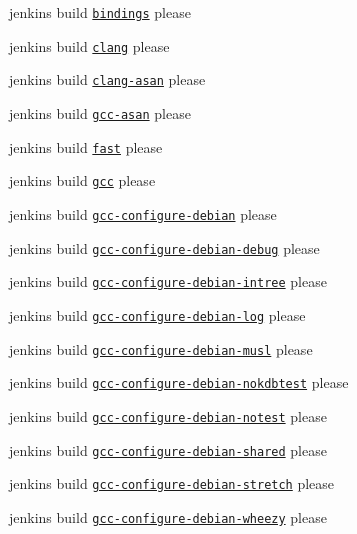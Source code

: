 \begin{DoxyItemize}
\item jenkins build \href{http://build.libelektra.org:8080/job/elektra-test-bindings/}{\tt bindings} please
\item jenkins build \href{http://build.libelektra.org:8080/job/elektra-clang/}{\tt clang} please
\item jenkins build \href{http://build.libelektra.org:8080/job/elektra-clang-asan/}{\tt clang-\/asan} please
\item jenkins build \href{http://build.libelektra.org:8080/job/elektra-gcc-asan/}{\tt gcc-\/asan} please
\item jenkins build \href{http://build.libelektra.org:8080/job/elektra-mergerequests-fast/}{\tt fast} please
\item jenkins build \href{http://build.libelektra.org:8080/job/elektra-gcc/}{\tt gcc} please
\item jenkins build \href{http://build.libelektra.org:8080/job/elektra-gcc-configure-debian/}{\tt gcc-\/configure-\/debian} please
\item jenkins build \href{http://build.libelektra.org:8080/job/elektra-gcc-configure-debian-debug}{\tt gcc-\/configure-\/debian-\/debug} please
\item jenkins build \href{http://build.libelektra.org:8080/job/elektra-gcc-configure-debian-intree/}{\tt gcc-\/configure-\/debian-\/intree} please
\item jenkins build \href{http://build.libelektra.org:8080/job/elektra-gcc-configure-debian-log}{\tt gcc-\/configure-\/debian-\/log} please
\item jenkins build \href{http://build.libelektra.org:8080/job/elektra-gcc-configure-debian-musl/}{\tt gcc-\/configure-\/debian-\/musl} please
\item jenkins build \href{http://build.libelektra.org:8080/job/elektra-gcc-configure-debian-nokdbtest/}{\tt gcc-\/configure-\/debian-\/nokdbtest} please
\item jenkins build \href{http://build.libelektra.org:8080/job/elektra-gcc-configure-debian-notest/}{\tt gcc-\/configure-\/debian-\/notest} please
\item jenkins build \href{http://build.libelektra.org:8080/job/elektra-gcc-configure-debian-shared/}{\tt gcc-\/configure-\/debian-\/shared} please
\item jenkins build \href{http://build.libelektra.org:8080/job/elektra-gcc-configure-debian-stretch/}{\tt gcc-\/configure-\/debian-\/stretch} please
\item jenkins build \href{http://build.libelektra.org:8080/job/elektra-gcc-configure-debian-wheezy/}{\tt gcc-\/configure-\/debian-\/wheezy} please

\end{DoxyItemize}
